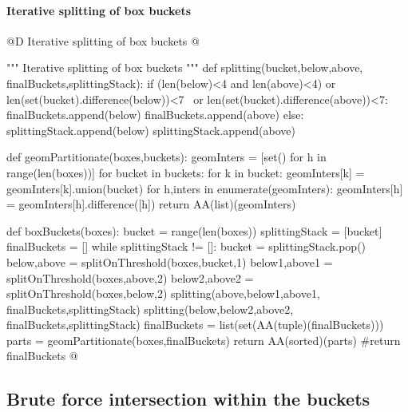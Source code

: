 \documentclass[11pt,oneside]{article}    %
\begin{document}
\paragraph{Iterative splitting of box buckets}
@D Iterative splitting of box buckets
@{""" Iterative splitting of box buckets """
def splitting(bucket,below,above, finalBuckets,splittingStack):
    if (len(below)<4 and len(above)<4) or len(set(bucket).difference(below))<7 \
        or len(set(bucket).difference(above))<7: 
        finalBuckets.append(below)
        finalBuckets.append(above)
    else: 
        splittingStack.append(below)
        splittingStack.append(above)

def geomPartitionate(boxes,buckets):
    geomInters = [set() for h in range(len(boxes))]
    for bucket in buckets:
        for k in bucket:
            geomInters[k] = geomInters[k].union(bucket)
    for h,inters in enumerate(geomInters):
        geomInters[h] = geomInters[h].difference([h])
    return AA(list)(geomInters)

def boxBuckets(boxes):
    bucket = range(len(boxes))
    splittingStack = [bucket]
    finalBuckets = []
    while splittingStack != []:
        bucket = splittingStack.pop()
        below,above = splitOnThreshold(boxes,bucket,1)
        below1,above1 = splitOnThreshold(boxes,above,2)
        below2,above2 = splitOnThreshold(boxes,below,2)                      
        splitting(above,below1,above1, finalBuckets,splittingStack)
        splitting(below,below2,above2, finalBuckets,splittingStack)      
        finalBuckets = list(set(AA(tuple)(finalBuckets)))
    parts = geomPartitionate(boxes,finalBuckets)
    return AA(sorted)(parts)
    #return finalBuckets
@}


\subsection{Brute force intersection within the buckets}
\end{document}
